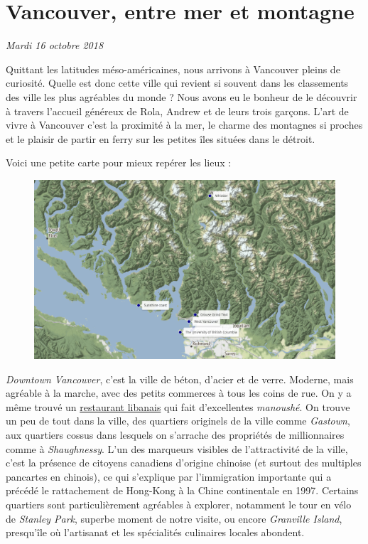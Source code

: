 \hypertarget{vancouver-entre-mer-et-montagne}{%
\section{Vancouver, entre mer et
montagne}\label{vancouver-entre-mer-et-montagne}}

\emph{Mardi 16 octobre 2018}

Quittant les latitudes méso-américaines, nous arrivons à Vancouver
pleins de curiosité. Quelle est donc cette ville qui revient si souvent
dans les classements des ville les plus agréables du monde ? Nous avons
eu le bonheur de le découvrir à travers l'accueil généreux de Rola,
Andrew et de leurs trois garçons. L'art de vivre à Vancouver c'est la
proximité à la mer, le charme des montagnes si proches et le plaisir de
partir en ferry sur les petites îles situées dans le détroit.

Voici une petite carte pour mieux repérer les lieux :

\begin{figure}
\centering
\includegraphics{maps/Vancouver.png}
\end{figure}

\emph{Downtown Vancouver}, c'est la ville de béton, d'acier et de verre.
Moderne, mais agréable à la marche, avec des petits commerces à tous les
coins de rue. On y a même trouvé un
\href{/manger-au-liban.html}{restaurant libanais} qui fait d'excellentes
\emph{manoushé}. On trouve un peu de tout dans la ville, des quartiers
originels de la ville comme \emph{Gastown}, aux quartiers cossus dans
lesquels on s'arrache des propriétés de millionnaires comme à
\emph{Shaughnessy}. L'un des marqueurs visibles de l'attractivité de la
ville, c'est la présence de citoyens canadiens d'origine chinoise (et
surtout des multiples pancartes en chinois), ce qui s'explique par
l'immigration importante qui a précédé le rattachement de Hong-Kong à la
Chine continentale en 1997. Certains quartiers sont particulièrement
agréables à explorer, notamment le tour en vélo de \emph{Stanley Park},
superbe moment de notre visite, ou encore \emph{Granville Island},
presqu'île où l'artisanat et les spécialités culinaires locales
abondent.

